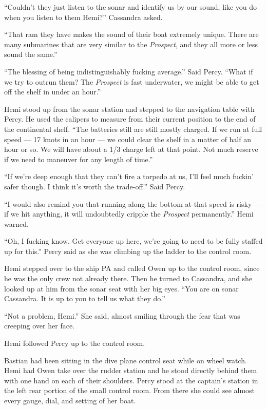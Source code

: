 \documentclass[
]{scrbook}
\begin{document}
``Couldn't they just listen to the sonar and identify us by our sound,
like you do when you listen to them Hemi?'' Cassandra asked.

``That ram they have makes the sound of their boat extremely unique.
There are many submarines that are very similar to the \emph{Prospect},
and they all more or less sound the same.''

``The blessing of being indistinguishably fucking average.'' Said Percy.
``What if we try to outrun them? The \emph{Prospect} is fast underwater,
we might be able to get off the shelf in under an hour.''

Hemi stood up from the sonar station and stepped to the navigation table
with Percy. He used the calipers to measure from their current position
to the end of the continental shelf. ``The batteries still are still
mostly charged. If we run at full speed --- 17 knots in an hour --- we
could clear the shelf in a matter of half an hour or so. We will have
about a 1/3 charge left at that point. Not much reserve if we need to
maneuver for any length of time.''

``If we're deep enough that they can't fire a torpedo at us, I'll feel
much fuckin' safer though. I think it's worth the trade-off.'' Said
Percy.

``I would also remind you that running along the bottom at that speed is
risky --- if we hit anything, it will undoubtedly cripple the
\emph{Prospect} permanently.'' Hemi warned.

``Oh, I fucking know. Get everyone up here, we're going to need to be
fully staffed up for this.'' Percy said as she was climbing up the
ladder to the control room.

Hemi stepped over to the ship PA and called Owen up to the control room,
since he was the only crew not already there. Then he turned to
Cassandra, and she looked up at him from the sonar seat with her big
eyes. ``You are on sonar Cassandra. It is up to you to tell us what they
do.''

``Not a problem, Hemi.'' She said, almost smiling through the fear that
was creeping over her face.

Hemi followed Percy up to the control room.

Bastian had been sitting in the dive plane control seat while on wheel
watch. Hemi had Owen take over the rudder station and he stood directly
behind them with one hand on each of their shoulders. Percy stood at the
captain's station in the left rear portion of the small control room.
From there she could see almost every gauge, dial, and setting of her
boat.
\end{document}
